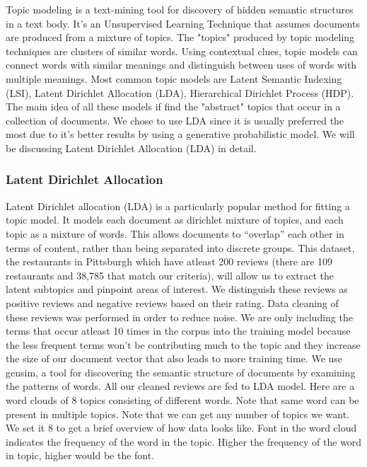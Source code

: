 \documentclass{neu_handout}
\begin{document}
Topic modeling is a text-mining tool for discovery of hidden semantic structures in a text body. It's an Unsupervised Learning Technique that assumes documents are produced from a mixture of topics. The "topics" produced by topic modeling techniques are clusters of similar words. Using contextual clues, topic models can connect words with similar meanings and distinguish between uses of words with multiple meanings. 
Most common topic models are Latent Semantic Indexing (LSI), Latent Dirichlet Allocation (LDA), Hierarchical Dirichlet Process (HDP). The main idea of all these models if find the "abstract" topics that occur in a collection of documents. We chose to use LDA since it is usually preferred the most due to it's better results by using a generative probabilistic model. We will be discussing Latent Dirichlet Allocation (LDA) in detail.

\subsubsection*{Latent Dirichlet Allocation}
Latent Dirichlet allocation (LDA) is a particularly popular method for fitting a topic model. It models each document as dirichlet mixture of topics, and each topic as a mixture of words. This allows documents to “overlap” each other in terms of content, rather than being separated into discrete groups.
This dataset, the restaurants in Pittsburgh which have atleast 200 reviews (there are 109 restaurants and 38,785 that match our criteria), will allow us to extract the latent subtopics and pinpoint areas of interest. We distinguish these reviews as positive reviews and negative reviews based on their rating. Data cleaning of these reviews was performed in order to reduce noise. We are only including the terms that occur atleast 10 times in the corpus into the training model because the less frequent terms won't be contributing much to the topic and they increase the size of our document vector that also leads to more training time. We use gensim, a tool for discovering the semantic structure of documents by examining the patterns of words. All our cleaned reviews are fed to LDA model. Here are a word clouds of 8 topics consisting of different words. Note that same word can be present in multiple topics.
Note that we can get any number of topics we want. We set it 8 to get a brief overview of how data looks like. Font in the word cloud indicates the frequency of the word in the topic. Higher the frequency of the word in topic, higher would be the font.
\end{document}
